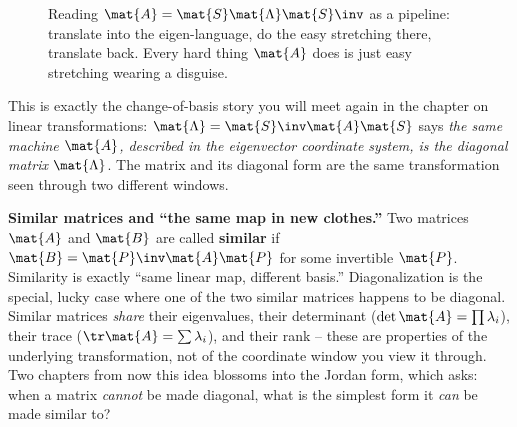 \begin{figure}[H]
\centering
{}
\caption{Reading $\mat{A}=\mat{S}\mat{\Lambda}\mat{S}\inv$ as a pipeline:
translate into the eigen-language, do the easy stretching there, translate back.
Every hard thing $\mat{A}$ does is just easy stretching wearing a disguise.}
\label{ch24:fig-pipeline}
\end{figure}

This is exactly the change-of-basis story you will meet again in the chapter on
linear transformations: $\mat{\Lambda} = \mat{S}\inv\mat{A}\mat{S}$ says
\emph{the same machine $\mat{A}$, described in the eigenvector coordinate system,
is the diagonal matrix $\mat{\Lambda}$}. The matrix and its diagonal form are the
same transformation seen through two different windows.

\begin{connectionbox}
\textbf{Similar matrices and ``the same map in new clothes.''} Two matrices
$\mat{A}$ and $\mat{B}$ are called \textbf{similar} if $\mat{B} =
\mat{P}\inv\mat{A}\mat{P}$ for some invertible $\mat{P}$. Similarity is exactly
``same linear map, different basis.'' Diagonalization is the special, lucky case
where one of the two similar matrices happens to be diagonal. Similar matrices
\emph{share} their eigenvalues, their determinant ($\det\mat{A} = \prod\lambda_i$),
their trace ($\tr\mat{A} = \sum\lambda_i$), and their rank -- these are
properties of the underlying transformation, not of the coordinate window you
view it through. Two chapters from now this idea blossoms into the Jordan form,
which asks: when a matrix \emph{cannot} be made diagonal, what is the simplest
form it \emph{can} be made similar to?
\end{connectionbox}

